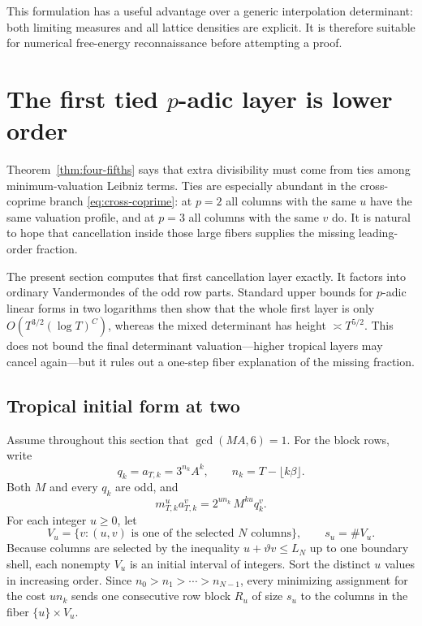 \documentclass[11pt,oneside]{article}
\theoremstyle{definition}
\theoremstyle{remark}
\begin{document}
This formulation has a useful advantage over a generic interpolation determinant: both
limiting measures and all lattice densities are explicit.  It is therefore suitable for
numerical free-energy reconnaissance before attempting a proof.

\section{The first tied \texorpdfstring{$p$}{p}-adic layer is lower order}
\label{sec:firstlayer}

Theorem~\ref{thm:four-fifths} says that extra divisibility must come from ties among
minimum-valuation Leibniz terms.  Ties are especially abundant in the cross-coprime branch
\eqref{eq:cross-coprime}: at $p=2$ all columns with the same $u$ have the same valuation
profile, and at $p=3$ all columns with the same $v$ do.  It is natural to hope that cancellation
inside those large fibers supplies the missing leading-order fraction.

The present section computes that first cancellation layer exactly.  It factors into ordinary
Vandermondes of the odd row parts.  Standard upper bounds for $p$-adic linear forms in two
logarithms then show that the whole first layer is only
$O(T^{3/2}(\log T)^C)$, whereas the mixed determinant has height $\asymp T^{5/2}$.  This does
not bound the final determinant valuation---higher tropical layers may cancel again---but it
rules out a one-step fiber explanation of the missing fraction.

\subsection{Tropical initial form at two}

Assume throughout this section that $\gcd(MA,6)=1$.  For the block rows, write
\begin{equation}\label{eq:odd-output}
 q_k=a_{T,k}=3^{n_k}A^k,
 \qquad n_k=T-\lfloor k\beta\rfloor.
\end{equation}
Both $M$ and every $q_k$ are odd, and
\begin{equation}\label{eq:two-entry-factor}
 m_{T,k}^{u}a_{T,k}^{v}
 =2^{u n_k}\,M^{ku}q_k^v.
\end{equation}
For each integer $u\ge0$, let
\[
 V_u=\{v:(u,v)\text{ is one of the selected }N\text{ columns}\},
 \qquad s_u=\#V_u.
\]
Because columns are selected by the inequality $u+\vartheta v\le L_N$ up to one boundary
shell, each nonempty $V_u$ is an initial interval of integers.  Sort the distinct $u$ values
in increasing order.  Since $n_0>n_1>\cdots>n_{N-1}$, every minimizing assignment for the
cost $un_k$ sends one consecutive row block $R_u$ of size $s_u$ to the columns in the fiber
$\{u\}\times V_u$.
\end{document}
